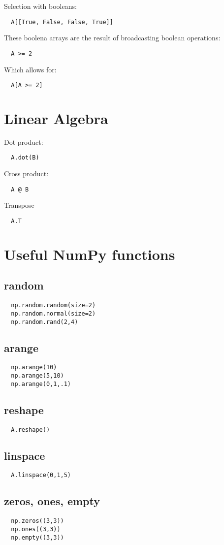 \documentclass[french]{article}
\begin{document}
Selection with booleans:
\begin{verbatim}
  A[[True, False, False, True]]
\end{verbatim}

These boolena arrays are the result of broadcasting boolean operations:
\begin{verbatim}
  A >= 2
\end{verbatim}

Which allows for:
\begin{verbatim}
  A[A >= 2]
\end{verbatim}

\section{Linear Algebra}

Dot product:
\begin{verbatim}
  A.dot(B)
\end{verbatim}

Cross product:
\begin{verbatim}
  A @ B
\end{verbatim}

Transpose
\begin{verbatim}
  A.T
\end{verbatim}

\section{Useful NumPy functions}

\subsection{random}
\begin{verbatim}
  np.random.random(size=2)
  np.random.normal(size=2)
  np.random.rand(2,4)
\end{verbatim}

\subsection{arange}
\begin{verbatim}
  np.arange(10)
  np.arange(5,10)
  np.arange(0,1,.1)
\end{verbatim}

\subsection{reshape}
\begin{verbatim}
  A.reshape()
\end{verbatim}

\subsection{linspace}
\begin{verbatim}
  A.linspace(0,1,5)
\end{verbatim}

\subsection{zeros, ones, empty}
\begin{verbatim}
  np.zeros((3,3))
  np.ones((3,3))
  np.empty((3,3))
\end{verbatim}
\end{document}

